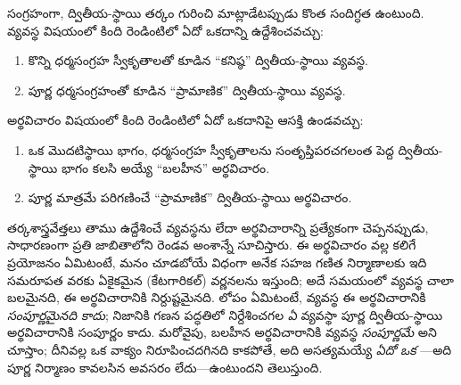 \documentclass[../../../include/open-logic-section]{subfiles}
\begin{document}
సంగ్రహంగా, ద్వితీయ-స్థాయి తర్కం గురించి మాట్లాడేటప్పుడు కొంత
సందిగ్ధత ఉంటుంది.  వ్యవస్థ విషయంలో కింది రెండింటిలో
ఏదో ఒకదాన్ని ఉద్దేశించవచ్చు:
\begin{enumerate}
\item కొన్ని ధర్మసంగ్రహ స్వీకృతాలతో కూడిన ``కనిష్ఠ'' ద్వితీయ-స్థాయి
   వ్యవస్థ.
\item పూర్ణ ధర్మసంగ్రహంతో కూడిన ``ప్రామాణిక'' ద్వితీయ-స్థాయి
   వ్యవస్థ.
\end{enumerate}
అర్థవిచారం విషయంలో కింది రెండింటిలో ఏదో ఒకదానిపై ఆసక్తి ఉండవచ్చు:
\begin{enumerate}
\item ఒక మొదటిస్థాయి భాగం, ధర్మసంగ్రహ స్వీకృతాలను సంతృప్తిపరచగలంత
  పెద్ద ద్వితీయ-స్థాయి భాగం కలసి  అయ్యే ``బలహీన''
  అర్థవిచారం.
\item పూర్ణ  మాత్రమే పరిగణించే ``ప్రామాణిక''
  ద్వితీయ-స్థాయి అర్థవిచారం.
\end{enumerate}
తర్కశాస్త్రవేత్తలు తాము ఉద్దేశించే  వ్యవస్థను లేదా
అర్థవిచారాన్ని ప్రత్యేకంగా చెప్పనప్పుడు, సాధారణంగా ప్రతి జాబితాలోని
రెండవ అంశాన్నే సూచిస్తారు. ఈ అర్థవిచారం వల్ల కలిగే ప్రయోజనం ఏమిటంటే,
మనం చూడబోయే విధంగా అనేక సహజ గణిత నిర్మాణాలకు ఇది సమరూపత వరకు
ఏకైకమైన (కేటగారికల్) వర్ణనలను ఇస్తుంది; అదే సమయంలో 
వ్యవస్థ చాలా బలమైనది, ఈ అర్థవిచారానికి నిర్దుష్టమైనది. లోపం ఏమిటంటే,
 వ్యవస్థ ఈ అర్థవిచారానికి \emph{సంపూర్ణమైనది కాదు};
నిజానికి గణన పద్ధతిలో నిర్దేశించగల \emph{ఏ}  వ్యవస్థా పూర్ణ
ద్వితీయ-స్థాయి అర్థవిచారానికి సంపూర్ణం కాదు. మరోవైపు, బలహీన
అర్థవిచారానికి  వ్యవస్థ \emph{సంపూర్ణమే} అని చూస్తాం;
దీనివల్ల ఒక వాక్యం నిరూపించదగినది కాకపోతే, అది అసత్యమయ్యే
\emph{ఏదో ఒక} ---అది పూర్ణ నిర్మాణం కావలసిన అవసరం
లేదు---ఉంటుందని తెలుస్తుంది.
\end{document}
